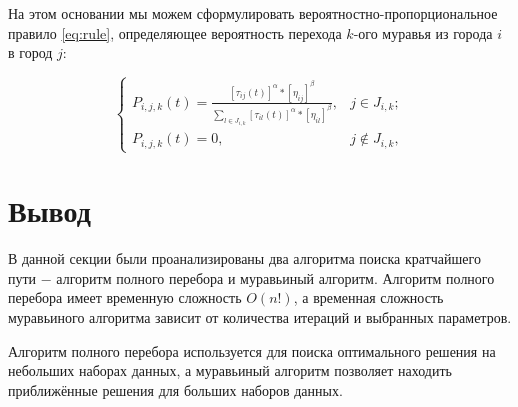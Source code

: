 На этом  основании мы можем сформулировать вероятностно-пропорциональное правило \ref{eq:rule}, определяющее вероятность перехода $k$-ого муравья из города $i$ в город $j$:

\begin{equation}
	\label{eq:rule}
	\begin{cases}
	P_{i,j,k}(t) = \frac{[\tau_{ij}(t)]^\alpha*[\eta_{ij}]^\beta}{\sum_{l\in J_{i,k}}^{}[\tau_{il}(t)]^\alpha * [\eta_{il}]^\beta}, & j \in J_{i,k};\\
	P_{i,j,k}(t) = 0, & j \notin J_{i,k},
	\end{cases}
\end{equation}

\section*{Вывод}

В данной секции были проанализированы два алгоритма поиска кратчайшего пути $-$ алгоритм полного перебора и муравьиный алгоритм. 
Алгоритм полного перебора имеет временную сложность $O(n!)$, а временная сложность муравьиного алгоритма зависит от количества итераций и выбранных параметров.

Алгоритм полного перебора используется для поиска оптимального решения на небольших наборах данных, а муравьиный алгоритм позволяет находить приближённые решения для больших наборов данных.
\clearpage
